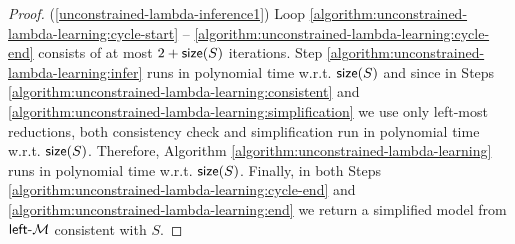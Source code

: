 \begin{proof} (\ref{unconstrained-lambda-inference1}) Loop \ref{algorithm:unconstrained-lambda-learning:cycle-start} -- \ref{algorithm:unconstrained-lambda-learning:cycle-end}  consists of at most $2 + \size(S)$ iterations. Step \ref{algorithm:unconstrained-lambda-learning:infer} runs in polynomial time w.r.t. $\size(S)$ and since in Steps \ref{algorithm:unconstrained-lambda-learning:consistent} and \ref{algorithm:unconstrained-lambda-learning:simplification} we use only left-most reductions, both consistency check and simplification run in polynomial time w.r.t. $\size(S)$. Therefore, Algorithm \ref{algorithm:unconstrained-lambda-learning} runs in polynomial time w.r.t. $\size(S)$. Finally, in both Steps \ref{algorithm:unconstrained-lambda-learning:cycle-end} and \ref{algorithm:unconstrained-lambda-learning:end} we return a simplified model from $\textup{\sf left-\textup{\sf $\mathcal{M}$}}$ consistent with $S$. 


\end{proof}

